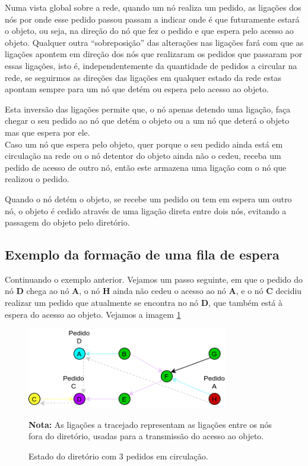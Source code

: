 
Numa vista global sobre a rede, quando um nó realiza um pedido, as ligações dos nós por onde esse pedido passou passam a indicar onde é que futuramente estará o objeto, ou seja, na direção do nó que fez o pedido e que espera pelo acesso ao objeto.
Qualquer outra ``sobreposição'' das alterações nas ligações fará com que as ligações apontem em direção dos nós que realizaram os pedidos que passaram por essas ligações, isto é, independentemente da quantidade de pedidos a circular na rede, se seguirmos as direções das ligações em qualquer estado da rede estas apontam sempre para um nó que detém ou espera pelo acesso ao objeto.

Esta inversão das ligações permite que, o nó apenas detendo uma ligação, faça chegar o seu pedido ao nó que detém o objeto ou a um nó que deterá o objeto mas que espera por ele. \\




Caso um nó que espera pelo objeto, quer porque o seu pedido ainda está em circulação na rede ou o nó detentor do objeto ainda não o cedeu, receba um pedido de acesso de outro nó, então este armazena uma ligação com o nó que realizou o pedido.

Quando o nó detém o objeto, se recebe um pedido ou tem em espera um outro nó, o objeto é cedido através de uma ligação direta entre dois nós, evitando a passagem do objeto pelo diretório.


\subsection*{Exemplo da formação de uma fila de espera}

Continuando o exemplo anterior. Vejamos um passo seguinte, em que o pedido do nó \textbf{D} chega ao nó \textbf{A}, o nó \textbf{H} ainda não cedeu o acesso ao nó \textbf{A}, e o nó \textbf{C} decidiu realizar um pedido que atualmente se encontra no nó \textbf{D}, que também está à espera do acesso ao objeto. Vejamos a imagem \ref{motivacao:img:3_pedidos}

\begin{figure}[!htb]
\centering
\includegraphics[width=250pt]{fila.png}
\caption{Estado do diretório com 3 pedidos em circulação.}
\label{motivacao:img:3_pedidos}
\textbf{Nota:} As ligações a tracejado representam as ligações entre os nós fora do diretório, usadas para a transmissão do acesso ao objeto.
\end{figure}


